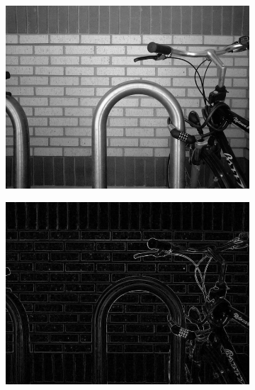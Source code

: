 \begin{figure}[H]
	\captionsetup{justification=centering}
	\begin{subfigure}[t]{2.5in}
		\centering
		\includegraphics[width=.9\textwidth]{./imagenes/operator0}
		\label{operator0}
	\end{subfigure}
	\begin{subfigure}[t]{2.5in}
		\centering
		\includegraphics[width=.9\textwidth]{./imagenes/operator1}
		\label{operator1}
	\end{subfigure}
	

\end{figure}
